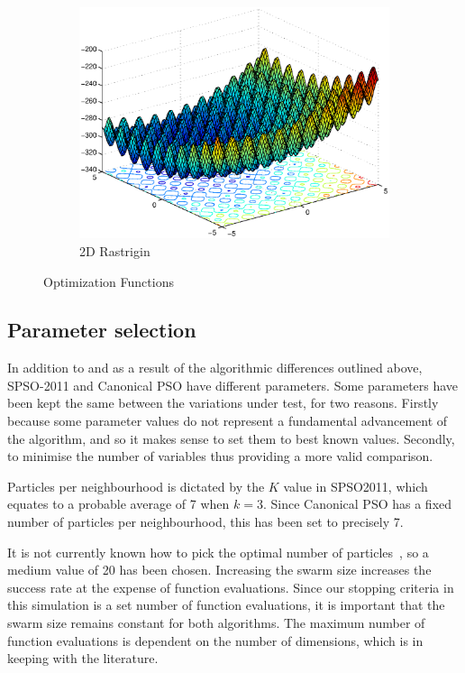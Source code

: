 \documentclass{csfourzero}
\begin{document}
\begin{figure}
\begin{subfigure}[b]{0.3\textwidth}
    \includegraphics[width=\textwidth]{../functions/rastrigin_shifted.eps}
    \caption{2D Rastrigin}
    \label{fig:rastrigin}
  \end{subfigure}
  \caption{Optimization Functions}
  \label{fig:functions}
\end{figure}

\subsection{Parameter selection}

In addition to and as a result of the algorithmic differences outlined above,
SPSO-2011 and Canonical PSO have different parameters. Some parameters have
been kept the same between the variations under test, for two reasons. Firstly
because some parameter values do not represent a fundamental advancement of the
algorithm, and so it makes sense to set them to best known values.  Secondly,
to minimise the number of variables thus providing a more valid comparison.

Particles per neighbourhood is dictated by the $K$ value in SPSO2011, which
equates to a probable average of 7 when $k = 3$. Since Canonical PSO has a fixed
number of particles per neighbourhood, this has been set to precisely 7.

It is not currently known how to pick the optimal number of
particles~\cite{Trelea:2003dv}, so a medium value of 20 has been chosen.
Increasing the swarm size increases the success rate at the expense of function
evaluations. Since our stopping criteria in this simulation is a set number of
function evaluations, it is important that the swarm size remains constant for
both algorithms. The maximum number of function evaluations is dependent on the
number of dimensions, which is in keeping with the literature.
\end{document}
